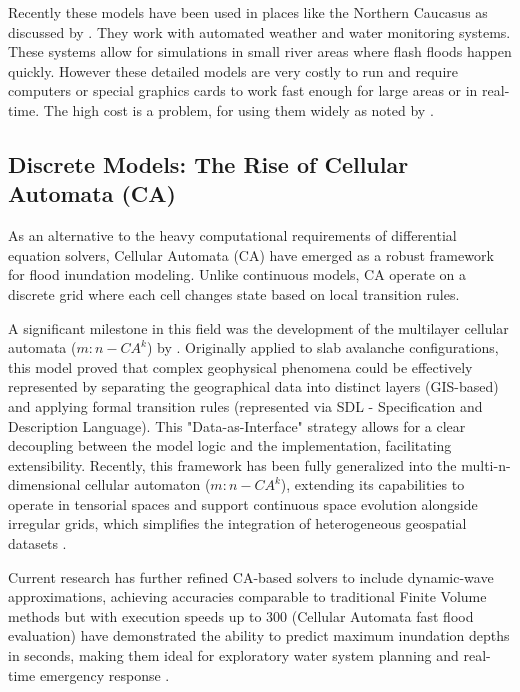 Recently these models have been used in places like the Northern Caucasus as discussed by \cite{Vasileva2021}. They work with automated 
weather and water monitoring systems. These systems allow for simulations in small river areas where flash floods happen quickly. 
However these detailed models are very costly to run and require computers or special graphics cards to work fast enough for large 
areas or in real-time. The high cost is a problem, for using them widely as noted by \cite{Aleksyuk2017}.


\subsection{Discrete Models: The Rise of Cellular Automata (CA)}

As an alternative to the heavy computational requirements of differential equation solvers, Cellular Automata (CA) have 
emerged as a robust framework for flood inundation modeling. Unlike continuous models, CA operate on a discrete grid 
where each cell changes state based on local transition rules.

A significant milestone in this field was the development of the multilayer cellular automata ($m:n-CA^k$) by \cite{Fonseca2011}. 
Originally applied to slab avalanche configurations, this model proved that complex geophysical phenomena 
could be effectively represented by separating the geographical data into distinct layers (GIS-based) and applying formal 
transition rules (represented via SDL - Specification and Description Language). This "Data-as-Interface" strategy allows 
for a clear decoupling between the model logic and the implementation, facilitating extensibility. Recently, this framework 
has been fully generalized into the multi-n-dimensional cellular automaton ($m:n-CA^k$), extending its capabilities 
to operate in tensorial spaces and support continuous space evolution alongside irregular grids, which simplifies the 
integration of heterogeneous geospatial datasets \cite{FonsecaiCasas2025}.

Current research has further refined CA-based solvers to include dynamic-wave approximations, achieving 
accuracies comparable to traditional Finite Volume methods but with execution speeds up to 300%
(Cellular Automata fast flood evaluation) have demonstrated the ability to predict maximum inundation depths in seconds, making 
them ideal for exploratory water system planning and real-time emergency response \parencite{Jamali2019}.


